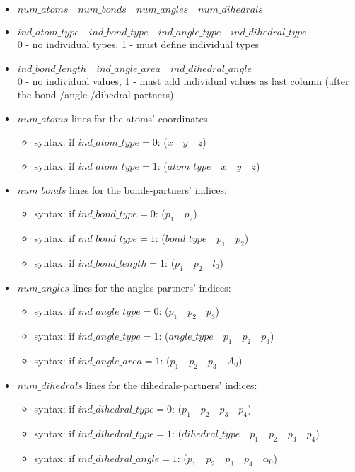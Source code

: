 \begin{itemize}
\item $num\_atoms \quad num\_bonds \quad num\_angles \quad num\_dihedrals$
\item $ind\_atom\_type \quad ind\_bond\_type \quad ind\_angle\_type \quad ind\_dihedral\_type$\\
	{0 - no individual types, 1 - must define individual types}
\item $ind\_bond\_length \quad ind\_angle\_area \quad ind\_dihedral\_angle$\\
	{0 - no individual values, 1 - must add individual values as last column (after the bond-/angle-/dihedral-partners)}
\item $num\_atoms$ lines for the atoms' coordinates
	\begin{itemize}
	\item syntax: if $ind\_atom\_type=0$: ($x \quad y \quad z$)
	\item syntax: if $ind\_atom\_type=1$: ($atom\_type \quad x \quad y \quad z$)
	\end{itemize}
\item $num\_bonds$ lines for the bonds-partners' indices:
	\begin{itemize}
	\item syntax: if $ind\_bond\_type=0$: ($p_1 \quad p_2$)
	\item syntax: if $ind\_bond\_type=1$: ($bond\_type \quad p_1 \quad p_2$)
	\item syntax: if $ind\_bond\_length=1$: ($p_1 \quad p_2 \quad l_0$)
	\end{itemize}
\item $num\_angles$ lines for the angles-partners' indices:
	\begin{itemize}
	\item syntax: if $ind\_angle\_type=0$: ($p_1 \quad p_2 \quad p_3$)
	\item syntax: if $ind\_angle\_type=1$: ($angle\_type \quad p_1 \quad p_2 \quad p_3$)
	\item syntax: if $ind\_angle\_area=1$: ($p_1 \quad p_2 \quad p_3 \quad A_0$)
	\end{itemize}
\item $num\_dihedrals$ lines for the dihedrals-partners' indices:
	\begin{itemize}
	\item syntax: if $ind\_dihedral\_type=0$: ($p_1 \quad p_2 \quad p_3 \quad p_4$)
	\item syntax: if $ind\_dihedral\_type=1$: ($dihedral\_type \quad p_1 \quad p_2 \quad p_3 \quad p_4$)
	\item syntax: if $ind\_dihedral\_angle=1$: ($p_1 \quad p_2 \quad p_3 \quad p_4 \quad \alpha_0$)
	\end{itemize}
\end{itemize}